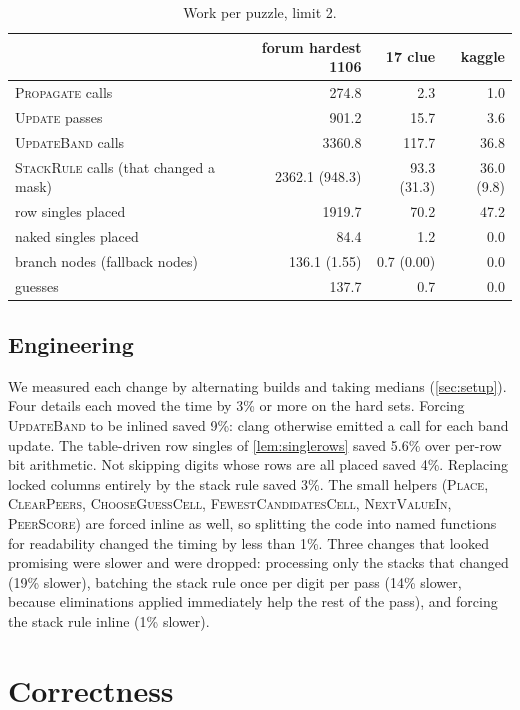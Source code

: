 \documentclass[11pt]{article}
\theoremstyle{definition}
\theoremstyle{plain}
\let\origtextsc\textsc
\renewcommand{\textsc}[1]{\textup{\origtextsc{#1}}}
\begin{document}
\begin{table}[t]
\centering
\caption{Work per puzzle, limit 2.}
\label{tab:work}
\small
\begin{tabular}{lrrr}
\toprule
& forum hardest 1106 & 17 clue & kaggle \\
\midrule
\textsc{Propagate} calls & 274.8 & 2.3 & 1.0 \\
\textsc{Update} passes & 901.2 & 15.7 & 3.6 \\
\textsc{UpdateBand} calls & 3360.8 & 117.7 & 36.8 \\
\textsc{StackRule} calls (that changed a mask) & 2362.1 (948.3) & 93.3 (31.3) & 36.0 (9.8) \\
row singles placed & 1919.7 & 70.2 & 47.2 \\
naked singles placed & 84.4 & 1.2 & 0.0 \\
branch nodes (fallback nodes) & 136.1 (1.55) & 0.7 (0.00) & 0.0 \\
guesses & 137.7 & 0.7 & 0.0 \\
\bottomrule
\end{tabular}
\end{table}

\subsection{Engineering}

We measured each change by alternating builds and taking medians (\cref{sec:setup}). Four details each moved the time
by 3\% or more on the hard sets. Forcing \textsc{UpdateBand} to be inlined saved 9\%: clang otherwise emitted a call
for each band update. The table-driven row singles of \cref{lem:singlerows} saved 5.6\% over per-row bit arithmetic.
Not skipping digits whose rows are all placed saved 4\%. Replacing locked columns entirely by the stack rule saved 3\%.
The small helpers (\textsc{Place}, \textsc{ClearPeers}, \textsc{ChooseGuessCell}, \textsc{FewestCandidatesCell},
\textsc{NextValueIn}, \textsc{PeerScore}) are forced inline as well, so splitting the code into named functions for
readability changed the timing by less than 1\%.
Three changes that looked promising were slower and were dropped: processing only the stacks that changed (19\%
slower), batching the stack rule once per digit per pass (14\% slower, because eliminations applied immediately help
the rest of the pass), and forcing the stack rule inline (1\% slower).

\section{Correctness}
\label{sec:proofs}
\end{document}
